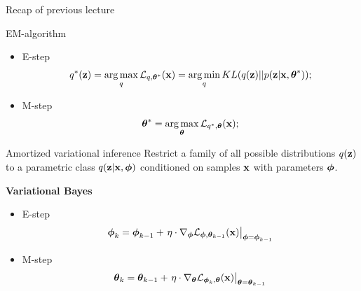 

\begin{frame}
\titlepage
\end{frame}
\begin{frame}{Recap of previous lecture}
	\begin{block}{EM-algorithm}
	\begin{itemize}
		\item E-step
		\[
			q^*(\mathbf{z}) = \operatorname*{arg\,max}_q \mathcal{L}_{q, \boldsymbol{\theta}^*}(\mathbf{x})
			= \operatorname*{arg\,min}_q KL(q(\mathbf{z}) || p(\mathbf{z} | \mathbf{x}, \boldsymbol{\theta}^*));
		\]
		\item M-step
		\[
			\boldsymbol{\theta}^* = \operatorname*{arg\,max}_{\boldsymbol{\theta}} \mathcal{L}_{q^*, \boldsymbol{\theta}}(\mathbf{x});
		\]
	\end{itemize}
	\vspace{-0.3cm}
	\end{block}
	\begin{block}{Amortized variational inference}
	Restrict a family of all possible distributions $q(\mathbf{z})$ to a parametric class $q(\mathbf{z}|\mathbf{x}, \boldsymbol{\phi})$ conditioned on samples $\mathbf{x}$ with parameters $\boldsymbol{\phi}$.
	\end{block}
	
	\textbf{Variational Bayes}
	\begin{itemize}
		\item E-step
		\[
		\boldsymbol{\phi}_k = \boldsymbol{\phi}_{k-1} + \left.\eta \cdot \nabla_{\boldsymbol{\phi}} \mathcal{L}_{\boldsymbol{\phi}, \boldsymbol{\theta}_{k-1}}(\mathbf{x})\right|_{\boldsymbol{\phi}=\boldsymbol{\phi}_{k-1}}
		\]
		\item M-step
		\[
		\boldsymbol{\theta}_k = \boldsymbol{\theta}_{k-1} + \left.\eta \cdot \nabla_{\boldsymbol{\theta}} \mathcal{L}_{\boldsymbol{\phi}_k, \boldsymbol{\theta}}(\mathbf{x})\right|_{\boldsymbol{\theta}=\boldsymbol{\theta}_{k-1}}
		\]
	\end{itemize}
\end{frame}
